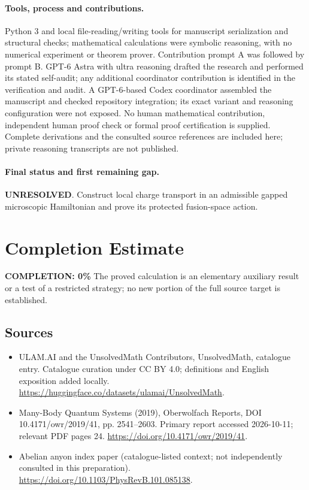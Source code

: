 \documentclass[11pt]{article}
\begin{document}
\paragraph{Tools, process and contributions.}
Python 3 and local file-reading/writing tools for manuscript serialization and structural checks; mathematical calculations were symbolic reasoning, with no numerical experiment or theorem prover. Contribution prompt A was followed by prompt B. GPT-6 Astra with ultra reasoning drafted the research and performed its stated self-audit; any additional coordinator contribution is identified in the verification and audit. A GPT-6-based Codex coordinator assembled the manuscript and checked repository integration; its exact variant and reasoning configuration were not exposed. No human mathematical contribution, independent human proof check or formal proof certification is supplied. Complete derivations and the consulted source references are included here; private reasoning transcripts are not published.

\paragraph{Final status and first remaining gap.}
\textbf{UNRESOLVED}. Construct local charge transport in an admissible gapped microscopic Hamiltonian and prove its protected fusion-space action.

\section{Completion Estimate}
\noindent\textbf{COMPLETION: 0\%}
The proved calculation is an elementary auxiliary result or a test of a restricted strategy; no new portion of the full source target is established.

\subsection{Sources}
\begin{itemize}
\item[\hypertarget{source:statement:1}{S1}] ULAM.AI and the UnsolvedMath Contributors, UnsolvedMath, catalogue entry. Catalogue curation under CC BY 4.0; definitions and English exposition added locally.
\url{https://huggingface.co/datasets/ulamai/UnsolvedMath}.
\item[\hypertarget{source:statement:2}{S2}] Many-Body Quantum Systems (2019), Oberwolfach Reports, DOI 10.4171/owr/2019/41, pp. 2541--2603. Primary report accessed 2026-10-11; relevant PDF pages 24.
\url{https://doi.org/10.4171/owr/2019/41}.
\item[\hypertarget{source:statement:3}{S3}] Abelian anyon index paper (catalogue-listed context; not independently consulted in this preparation).
\url{https://doi.org/10.1103/PhysRevB.101.085138}.
\end{itemize}
\label{end:statement}
\end{document}
